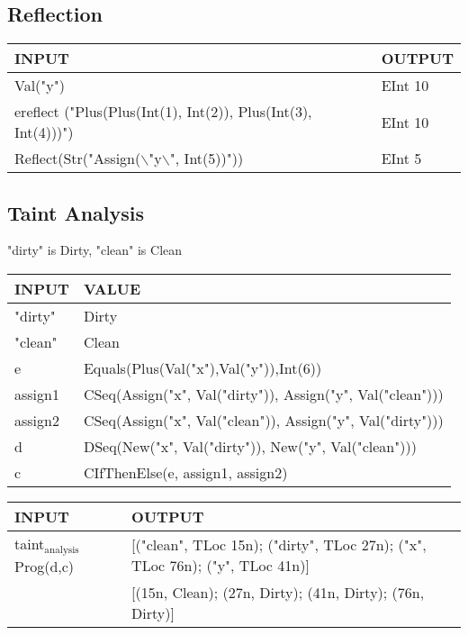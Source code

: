 \documentclass[11pt]{article}
\begin{document}
\subsection{Reflection}
\label{sec:org3dccaca}
\begin{center}
\begin{tabularx}{\textwidth}{Xl}
INPUT & OUTPUT\\
\hline
Val("y") & EInt 10\\
ereflect ("Plus(Plus(Int(1), Int(2)), Plus(Int(3), Int(4)))") & EInt 10\\
Reflect(Str("Assign($\backslash$"y$\backslash$", Int(5))")) & EInt 5\\
\end{tabularx}
\end{center}
\subsection{Taint Analysis}
\label{sec:org88974e0}
"dirty" is Dirty, "clean" is Clean
\begin{center}
\begin{tabularx}{\textwidth}{lX}
INPUT & VALUE\\
\hline
"dirty" & Dirty\\
"clean" & Clean\\
e & Equals(Plus(Val("x"),Val("y")),Int(6))\\
assign1 & CSeq(Assign("x", Val("dirty")), Assign("y", Val("clean")))\\
assign2 & CSeq(Assign("x", Val("clean")), Assign("y", Val("dirty")))\\
d & DSeq(New("x", Val("dirty")), New("y", Val("clean")))\\
c & CIfThenElse(e, assign1, assign2)\\
\end{tabularx}
\end{center}

\begin{center}
\begin{tabularx}{\textwidth}{lX}
INPUT & OUTPUT\\
\hline
taint\(_{\text{analysis}}\) Prog(d,c) & [("clean", TLoc 15n); ("dirty", TLoc 27n); ("x", TLoc 76n); ("y", TLoc 41n)]\\
 & [(15n, Clean); (27n, Dirty); (41n, Dirty); (76n, Dirty)]\\
\end{tabularx}
\end{center}
\end{document}
